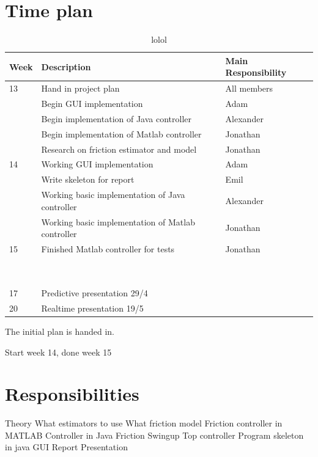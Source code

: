 \documentclass[10pt,a4paper]{article}
\begin{document}
\section{Time plan}
\begin{table}[]
\centering
\caption{lolol}
\label{hoho}
\begin{tabular}{|l|l|l|}
\hline
Week & Description & Main Responsibility \\ \hline
13 & Hand in project plan & All members \\ \hline
& Begin GUI implementation & Adam \\ \hline
& Begin implementation of Java controller & Alexander \\ \hline
& Begin implementation of Matlab controller & Jonathan \\ \hline
& Research on friction estimator and model & Jonathan \\ \hline
14 & Working GUI implementation & Adam \\ \hline
& Write skeleton for report & Emil \\ \hline
& Working basic implementation of Java controller & Alexander \\ \hline
& Working basic implementation of Matlab controller & Jonathan \\ \hline
15 & Finished Matlab controller for tests & Jonathan \\ \hline
& & \\ \hline
& & \\ \hline
& & \\ \hline
& & \\ \hline
& & \\ \hline
& & \\ \hline
& & \\ \hline
& & \\ \hline
& & \\ \hline
17 & Predictive presentation 29/4 & \\ \hline
20 & Realtime presentation 19/5  & \\ \hline
\end{tabular}
\end{table}
The initial plan is handed in.


Start week 14, done week 15

\section{Responsibilities}
Theory
	What estimators to use
	What friction model
Friction controller in MATLAB
Controller in Java
	Friction
	Swingup
	Top controller
Program skeleton in java
GUI
Report
Presentation
\end{document}
